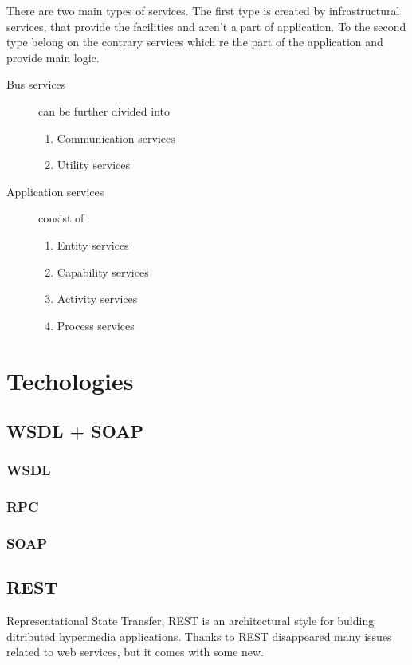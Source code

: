 There are two main types of services. The first type is created by infrastructural services, that provide the facilities and aren't a part of application. To the second type belong on the contrary services which re the part of the application and provide main logic.

\begin{description}
  \item[Bus services] can be further divided into 
  \begin{enumerate}
    \item Communication services
    \item Utility services
  \end{enumerate}
  \item[Application services] consist of   
  \begin{enumerate}
    \item Entity services
    \item Capability services
    \item Activity services
    \item Process services
  \end{enumerate}
\end{description}


\section{Techologies}

\subsection{WSDL + SOAP}
\subsubsection{WSDL}
\subsubsection{RPC}
\subsubsection{SOAP}

\subsection{REST}

Representational State Transfer, REST is an architectural style for bulding ditributed hypermedia applications.
Thanks to REST disappeared many issues related to web services, but it comes with some new.

